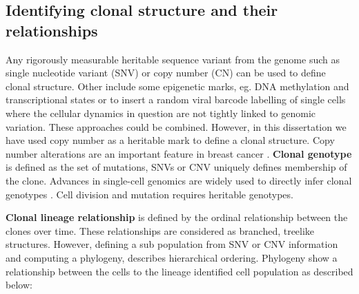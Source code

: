 \subsection{Identifying clonal structure and their relationships}

Any rigorously measurable heritable sequence variant from the genome such as single nucleotide variant (SNV) or copy number (CN) can be used to define clonal structure. 
Other include some epigenetic marks, eg. DNA methylation and transcriptional states or to insert a random viral barcode labelling of single cells where the cellular dynamics in question are not tightly linked to genomic variation. These approaches could be combined. However, in this dissertation we have used copy number as a heritable mark to define a clonal structure. Copy number alterations are an important feature in breast cancer \cite{zhang2009copy, pollack2002microarray}. \textbf{Clonal genotype} is defined as the set of mutations, SNVs or CNV uniquely defines membership of the clone. Advances in single-cell genomics are widely used to directly infer clonal genotypes \cite{macosko2015highly,laks2019clonal}. Cell division and mutation requires heritable genotypes.


 \textbf{Clonal lineage relationship} is defined by the ordinal relationship between the clones over time. These relationships are considered as branched, treelike structures. However, defining a sub population from SNV or CNV information and computing a phylogeny, describes hierarchical ordering. Phylogeny show a relationship between the cells to the lineage identified cell population as described below:
 
